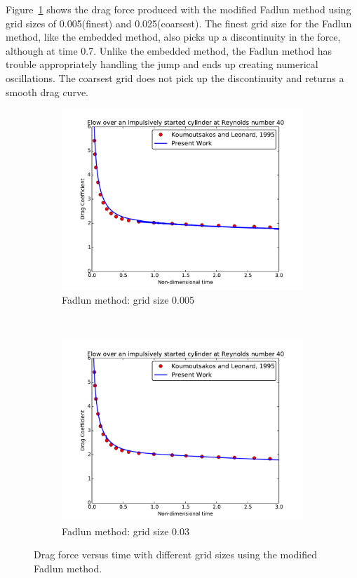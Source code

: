 Figure~\ref{fig:fadlun005} shows the drag force produced with the modified Fadlun method using grid sizes of 0.005(finest) and 0.025(coarsest).
The finest grid size for the Fadlun method, like the embedded method, also picks up a discontinuity in the force, although at time 0.7.
Unlike the embedded method, the Fadlun method has trouble appropriately handling the jump and ends up creating numerical oscillations. 
The coarsest grid does not pick up the discontinuity and returns a smooth drag curve. 

\begin{figure}[!htb]
	\centering
	\begin{subfigure}{0.4\textwidth}
		\includegraphics[width=\linewidth]{fadlun005}
		\caption{Fadlun method: grid size 0.005}
	\end{subfigure}
	~
	\begin{subfigure}{0.4\textwidth}
			\includegraphics[width=\linewidth]{fadlun03}
			\caption{Fadlun method: grid size 0.03}
	\end{subfigure}
	\caption{Drag force versus time with different grid sizes using the modified Fadlun method.}
	\label{fig:fadlun005}
\end{figure}

